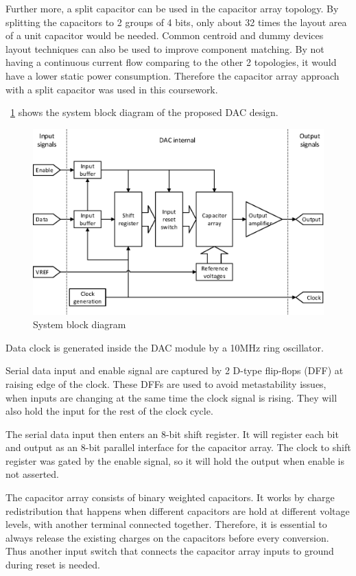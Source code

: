 \documentclass[journal]{IEEEtran}
\newcommand{\fref}[1]{\figurename~\ref{#1}}
\begin{document}
Further more, a split capacitor can be used in the capacitor array topology. By splitting the capacitors to 2 groups of 4 bits, only about 32 times the layout area of a unit capacitor would be needed. Common centroid and dummy devices layout techniques can also be used to improve component matching. By not having a continuous current flow comparing to the other 2 topologies, it would have a lower static power consumption. Therefore the capacitor array approach with a split capacitor was used in this coursework.

\fref{fig_system} shows the system block diagram of the proposed DAC design.

\begin{figure}[!t]
	\centering
	\includegraphics[width=\columnwidth]{System}
	\caption{System block diagram}
	\label{fig_system}
\end{figure}

Data clock is generated inside the DAC module by a 10MHz ring oscillator.

Serial data input and enable signal are captured by 2 D-type flip-flops (DFF) at raising edge of the clock. These DFFs are used to avoid metastability issues, when inputs are changing at the same time the clock signal is rising. They will also hold the input for the rest of the clock cycle.

The serial data input then enters an 8-bit shift register. It will register each bit and output as an 8-bit parallel interface for the capacitor array. The clock to shift register was gated by the enable signal, so it will hold the output when enable is not asserted.

The capacitor array consists of binary weighted capacitors. It works by charge redistribution that happens when different capacitors are hold at different voltage levels, with another terminal connected together. Therefore, it is essential to always release the existing charges on the capacitors before every conversion. Thus another input switch that connects the capacitor array inputs to ground during reset is needed.
\end{document}
